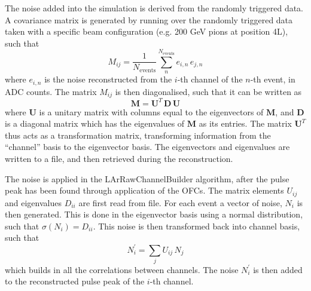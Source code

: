 %
%


The noise added into the simulation is derived from the randomly triggered data. A covariance matrix is generated by running over the randomly triggered data taken with a specific beam configuration (e.g. 200 GeV pions at position 4L), such that 
\begin{equation}
M_{ij} = \frac{1}{N_\mathrm{events}}\sum_n^{N_\mathrm{events}} e_{i,n} \, e_{j,n}
\end{equation}
where $e_{i,n}$ is the noise reconstructed from the $i$-th channel of the $n$-th event, in ADC counts. The matrix $M_{ij}$ is then diagonalised, such that it can be written as
\begin{equation}
\mathbf{M} = \mathbf{U}^T \, \mathbf{D} \, \mathbf{U}
\end{equation}
where $\mathbf{U}$ is a unitary matrix with columns equal to the eigenvectors of $\mathbf{M}$, and $\mathbf{D}$ is a diagonal matrix which has the eigenvalues of $\mathbf{M}$ as its entries. The matrix $\mathbf{U}^T$ thus acts as a transformation matrix, transforming information from the ``channel'' basis to the eigenvector basis. The eigenvectors and eigenvalues are written to a file, and then retrieved during the reconstruction.

The noise is applied in the LArRawChannelBuilder algorithm, after the pulse peak has been found through application of the OFCs. The matrix elements $U_{ij}$ and eigenvalues $D_{ii}$ are first read from file. For each event a vector of noise, $N_i$ is then generated. This is done in the eigenvector basis using a normal distribution, such that $\sigma (N_i) = D_{ii}$. This noise is then transformed back into channel basis, such that 
\begin{equation}
N^\prime_i = \sum_j U_{ij} \, N_j
\end{equation} 
which builds in all the correlations between channels. The noise $N^\prime_i$ is then added to the reconstructed pulse peak of the $i$-th channel.

